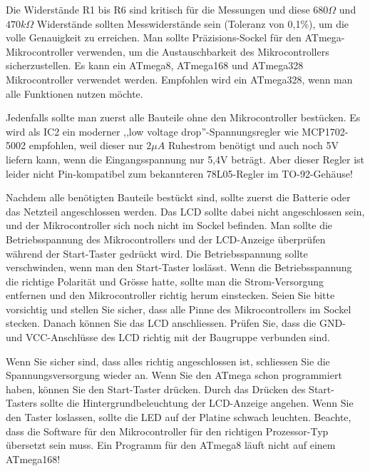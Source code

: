 Die Widerstände R1 bis R6 sind kritisch für die Messungen und diese \(680\Omega\) und
\(470k\Omega\) Widerstände sollten Messwiderstände sein (Toleranz von 0,1\%), um 
die volle Genauigkeit zu erreichen.
Man sollte Präzisions-Sockel für den ATmega-Mikrocontroller verwenden, um
die Austauschbarkeit des Mikrocontrollers sicherzustellen.
Es kann ein ATmega8, ATmega168 und ATmega328 Mikrocontroller verwendet werden.
Empfohlen wird ein ATmega328, wenn man alle Funktionen nutzen möchte.

Jedenfalls sollte man zuerst alle Bauteile ohne den Mikrocontroller bestücken.
Es wird als IC2 ein moderner ,,low voltage drop''-Spannungsregler wie MCP1702-5002 empfohlen, weil
dieser nur \(2\mu A\) Ruhestrom benötigt und auch noch 5V liefern kann, 
 wenn die Eingangsspannung nur 5,4V beträgt.
Aber dieser Regler ist leider nicht Pin-kompatibel zum bekannteren 78L05-Regler im TO-92-Gehäuse!

Nachdem alle benötigten Bauteile bestückt sind, sollte zuerst die Batterie
oder das Netzteil angeschlossen werden. Das LCD sollte dabei nicht angeschlossen sein, und der Mikrocontroller sich noch nicht im Sockel befinden.
Man sollte die Betriebsspannung des Mikrocontrollers und der LCD-Anzeige
überprüfen während der Start-Taster gedrückt wird.
Die Betriebsspannung sollte verschwinden, wenn man den Start-Taster loslässt.
Wenn die Betriebsspannung die richtige Polarität und Grösse hatte,
sollte man die Strom-Versorgung entfernen und den Mikrocontroller 
richtig herum einstecken. Seien Sie bitte vorsichtig und stellen Sie sicher,
dass alle Pinne des Mikrocontrollers im Sockel stecken.
Danach können Sie das LCD anschliessen. Prüfen Sie, dass die GND- und VCC-Anschlüsse des LCD richtig mit der Baugruppe verbunden sind.

Wenn Sie sicher sind, dass alles richtig angeschlossen ist, schliessen Sie
die Spannungsversorgung wieder an.
Wenn Sie den ATmega schon programmiert haben, können Sie den Start-Taster
drücken.
Durch das Drücken des Start-Tasters sollte die Hintergrundbeleuchtung
der LCD-Anzeige angehen.
Wenn Sie den Taster loslassen, sollte die LED auf der Platine schwach leuchten.
Beachte, dass die Software für den Mikrocontroller für den richtigen
Prozessor-Typ übersetzt sein muss. Ein Programm für den ATmega8 läuft
nicht auf einem ATmega168!

